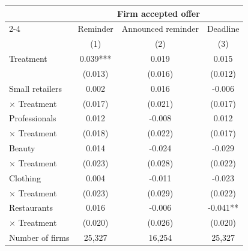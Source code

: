 \begin{tabular}[t]{lccc}
\toprule
& \multicolumn{3}{c}{Firm accepted offer} \\
\cmidrule(lr){2-4} 

  \multicolumn{1}{r}{Treatment:} & Reminder & Announced reminder & Deadline\\
& (1) & (2) & (3)\\
\midrule
Treatment & 0.039*** & 0.019 & 0.015\\
 & (0.013) & (0.016) & (0.012)\\
Small retailers & 0.002 & 0.016 & -0.006\\
 \quad $\times$ Treatment & (0.017) & (0.021) & (0.017)\\
Professionals & 0.012 & -0.008 & 0.012\\
 \quad $\times$ Treatment & (0.018) & (0.022) & (0.017)\\
Beauty & 0.014 & -0.024 & -0.029\\
 \quad $\times$ Treatment & (0.023) & (0.028) & (0.022)\\
Clothing & 0.004 & -0.011 & -0.023\\
 \quad $\times$ Treatment & (0.023) & (0.029) & (0.022)\\
Restaurants & 0.016 & -0.006 & -0.041**\\
 \quad $\times$ Treatment & (0.020) & (0.026) & (0.020)\\
\midrule
Number of firms & 25,327 & 16,254 & 25,327\\
\bottomrule
\end{tabular}


